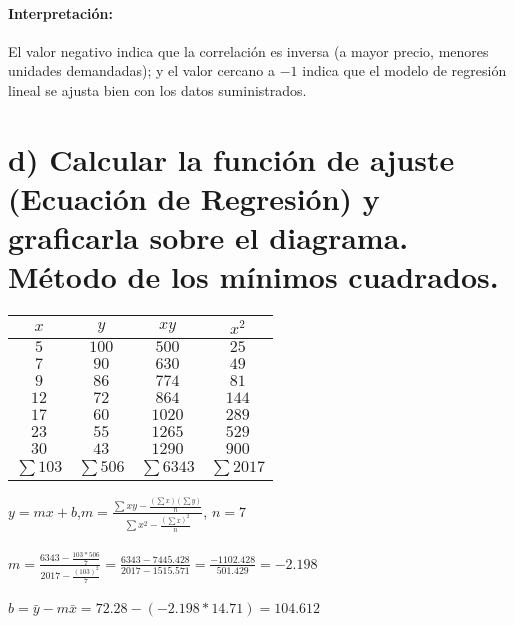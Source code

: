 \documentclass[12pt]{article}
\begin{document}
	\paragraph{Interpretación:} \small{El valor negativo indica que la correlación es inversa (a mayor precio, menores unidades demandadas); y el valor cercano a $-1$ indica que el modelo de regresión lineal se ajusta bien con los datos suministrados.}
	
	\section*{d) Calcular la función de ajuste (Ecuación de Regresión) y graficarla sobre el diagrama. Método de los mínimos cuadrados.}
	
	\begin{table}[h]
		\centering
		\begin{tabular}{|c|c|c|c|}
			\hline
			$x$ & $y$ & $xy$ & $x^2$ \\ \hline
			$5$ & $100$ & $500$ & $25$ \\ \hline
			$7$ & $90$ & $630$ & $49$ \\ \hline
			$9$ & $86$ & $774$ & $81$ \\ \hline
			$12$ & $72$ & $864$ & $144$ \\ \hline
			$17$ & $60$ & $1020$ & $289$ \\ \hline
			$23$ & $55$ & $1265$ & $529$ \\ \hline
			$30$ & $43$ & $1290$ & $900$ \\ \hline
			$\sum{103}$ & $\sum{506}$ & $\sum{6343}$ & $\sum{2017}$ \\ \hline
		\end{tabular}
	\end{table}
	
	\Large{$y=mx+b$},\hspace{10pt}\LARGE{$m=\frac{\sum{xy}-\frac{(\sum{x})(\sum{y})}{n}}{\sum{x^2}-\frac{(\sum{x})^2}{n}}$}, \hspace{12pt}\Large{$n=7$} \\ \\
	$m=\frac{6343-\frac{103*506}{7}}{2017-\frac{(103)^2}{7}}=\frac{6343-7445.428}{2017-1515.571}=\frac{-1102.428}{501.429}=-2.198$ \\ \\
	$b=\bar{y}-m\bar{x} = 72.28-(-2.198*14.71)=104.612$
	
\end{document}
